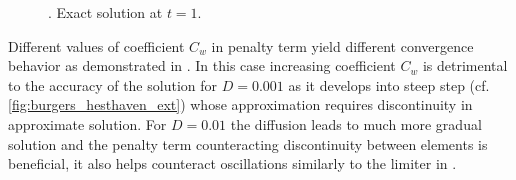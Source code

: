 \begin{example}
\begin{figure}[h]
	\caption{. Exact solution at $t = 1$.}
	\label{fig:burgess_hesthaven_ext}
\end{figure}
Different values of coefficient $C_w$ in penalty term yield different convergence 
behavior as demonstrated in . In this case increasing 
coefficient $C_w$ is detrimental to the accuracy of the solution for $D=0.001$ as it 
develops into steep step (cf. \cref{fig:burgers_hesthaven_ext}) whose approximation 
requires discontinuity in approximate solution. For $D=0.01$ the diffusion leads to much 
more gradual solution and the penalty term counteracting discontinuity between elements 
is beneficial, it also helps counteract oscillations similarly to the limiter in 
. 
\end{example}
